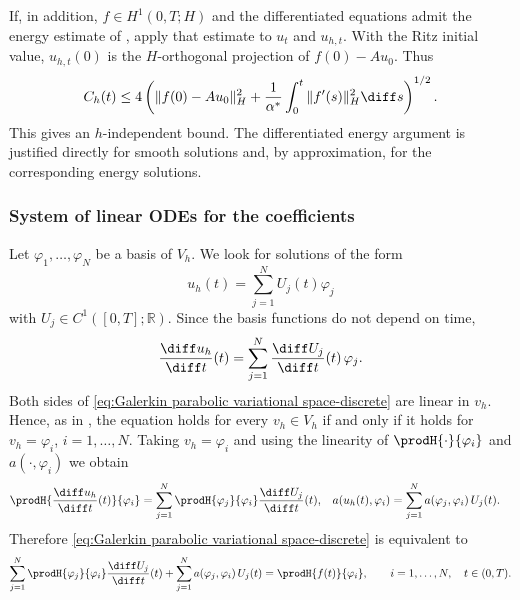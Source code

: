 If, in addition, $f\in H^1(0,T;H)$ and the differentiated equations admit the energy estimate of , apply that estimate to $u_t$ and $u_{h,t}$. With the Ritz initial value, $u_{h,t}(0)$ is the $H$-orthogonal projection of $f(0)-Au_0$. Thus
\begin{equation*}
    C_h(t) \le 4\left(\|f(0)-Au_0\|_H^2+
    \frac{1}{\alpha^*}\int_0^t\|f'(s)\|_H^2\diff s\right)^{1/2}.
\end{equation*}
This gives an $h$-independent bound. The differentiated energy argument is justified directly for smooth solutions and, by approximation, for the corresponding energy solutions.

\subsubsection{System of linear ODEs for the coefficients}
\label{sec:Galerkin parabolic linear ODEs}
Let $\varphi_1, \dots, \varphi_N$ be a basis of $V_h$.
We look for solutions of the form
\begin{equation*}
    u_h(t) = \sum_{j=1}^{N} U_j(t) \varphi_j
\end{equation*}
with $U_j \in C^1([0,T];\mathbb R)$. Since the basis functions do not depend on time,
\begin{equation*}
    \frac{\diff u_h}{\diff t}(t) = \sum_{j=1}^N \frac{\diff U_j}{\diff t}(t)\, \varphi_j .
\end{equation*}
Both sides of \eqref{eq:Galerkin parabolic variational space-discrete} are linear in $v_h$. Hence, as in , the equation holds for every $v_h \in V_h$ if and only if it holds for $v_h = \varphi_i$, $i = 1, \dots, N$. Taking $v_h = \varphi_i$ and using the linearity of $\prodH{\cdot}{\varphi_i}$ and $a(\cdot, \varphi_i)$ we obtain
\begin{align*}
    \prodH{\frac{\diff u_h}{\diff t}(t)}{\varphi_i} & = \sum_{j=1}^N \prodH{\varphi_j}{\varphi_i} \frac{\diff U_j}{\diff t}(t), &
    a(u_h(t), \varphi_i)                            & = \sum_{j=1}^N a(\varphi_j, \varphi_i)\, U_j(t).
\end{align*}
Therefore \eqref{eq:Galerkin parabolic variational space-discrete} is equivalent to
\begin{equation*}
    \sum_{j=1}^N \prodH{\varphi_j}{\varphi_i} \frac{\diff U_j}{\diff t}(t) + \sum_{j=1}^N a(\varphi_j, \varphi_i)\, U_j(t) = \prodH{f(t)}{\varphi_i}, \qquad i = 1, \dots, N, \quad t \in (0,T).
\end{equation*}
